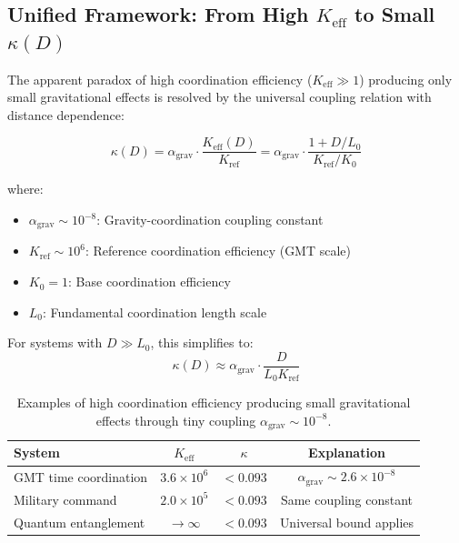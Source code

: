 \documentclass[11pt,a4paper]{article}
\begin{document}
	\subsection{Unified Framework: From High $K_{\mathrm{eff}}$ to Small $\kappa(D)$}
	
	The apparent paradox of high coordination efficiency ($K_{\mathrm{eff}} \gg 1$) 
	producing only small gravitational effects is resolved by the universal coupling 
	relation with distance dependence:
	
	\begin{equation}
		\boxed{\kappa(D) = \alpha_{\text{grav}} \cdot \frac{K_{\mathrm{eff}}(D)}{K_{\text{ref}}} 
			= \alpha_{\text{grav}} \cdot \frac{1 + D/L_0}{K_{\text{ref}}/K_0}}
	\end{equation}
	
	where:
	\begin{itemize}
		\item $\alpha_{\text{grav}} \sim 10^{-8}$: Gravity-coordination coupling constant
		\item $K_{\text{ref}} \sim 10^6$: Reference coordination efficiency (GMT scale)
		\item $K_0 = 1$: Base coordination efficiency
		\item $L_0$: Fundamental coordination length scale
	\end{itemize}
	
	For systems with $D \gg L_0$, this simplifies to:
	\begin{equation}
		\kappa(D) \approx \alpha_{\text{grav}} \cdot \frac{D}{L_0 K_{\text{ref}}}
	\end{equation}
	
	\begin{table}[htbp]
		\centering
		\begin{tabular}{lccc}
			\toprule
			\textbf{System} & \textbf{$K_{\mathrm{eff}}$} & \textbf{$\kappa$} & \textbf{Explanation} \\
			\midrule
			GMT time coordination & $3.6\times10^6$ & $<0.093$ & $\alpha_{\text{grav}} \sim 2.6\times10^{-8}$ \\
			Military command & $2.0\times10^5$ & $<0.093$ & Same coupling constant \\
			Quantum entanglement & $\to\infty$ & $<0.093$ & Universal bound applies \\
			\bottomrule
		\end{tabular}
		\caption{Examples of high coordination efficiency producing small gravitational effects through tiny coupling $\alpha_{\text{grav}} \sim 10^{-8}$.}
	\end{table}
	
\end{document}
